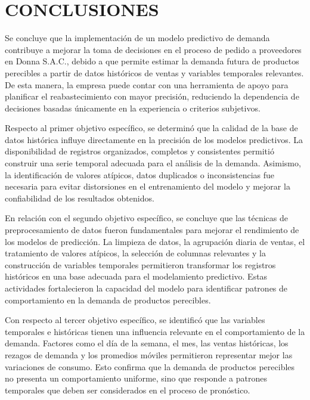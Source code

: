 \chapter{CONCLUSIONES}

Se concluye que la implementación de un modelo predictivo de demanda contribuye a mejorar la toma de decisiones en el proceso de pedido a proveedores en Donna S.A.C., debido a que permite estimar la demanda futura de productos perecibles a partir de datos históricos de ventas y variables temporales relevantes. De esta manera, la empresa puede contar con una herramienta de apoyo para planificar el reabastecimiento con mayor precisión, reduciendo la dependencia de decisiones basadas únicamente en la experiencia o criterios subjetivos.

Respecto al primer objetivo específico, se determinó que la calidad de la base de datos histórica influye directamente en la precisión de los modelos predictivos. La disponibilidad de registros organizados, completos y consistentes permitió construir una serie temporal adecuada para el análisis de la demanda. Asimismo, la identificación de valores atípicos, datos duplicados o inconsistencias fue necesaria para evitar distorsiones en el entrenamiento del modelo y mejorar la confiabilidad de los resultados obtenidos.

En relación con el segundo objetivo específico, se concluye que las técnicas de preprocesamiento de datos fueron fundamentales para mejorar el rendimiento de los modelos de predicción. La limpieza de datos, la agrupación diaria de ventas, el tratamiento de valores atípicos, la selección de columnas relevantes y la construcción de variables temporales permitieron transformar los registros históricos en una base adecuada para el modelamiento predictivo. Estas actividades fortalecieron la capacidad del modelo para identificar patrones de comportamiento en la demanda de productos perecibles.

Con respecto al tercer objetivo específico, se identificó que las variables temporales e históricas tienen una influencia relevante en el comportamiento de la demanda. Factores como el día de la semana, el mes, las ventas históricas, los rezagos de demanda y los promedios móviles permitieron representar mejor las variaciones de consumo. Esto confirma que la demanda de productos perecibles no presenta un comportamiento uniforme, sino que responde a patrones temporales que deben ser considerados en el proceso de pronóstico.

